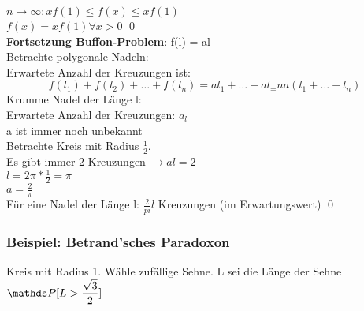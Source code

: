 $n \rightarrow\infty: x f(1) \leq f(x) \leq x f(1)$\smallskip\\
$f(x) = xf(1) \forall x > 0$ \qed\bigskip\\
\textbf{Fortsetzung Buffon-Problem}: f(l) = al\\
Betrachte polygonale Nadeln: \smallskip\\
Erwartete Anzahl der Kreuzungen ist: 
$$f(l_1)+f(l_2)+\dots+f(l_n) = al_1+\dots+al_=n  a(l_1+\dots+l_n)$$
Krumme Nadel der Länge l: \medskip\\
Erwartete Anzahl der Kreuzungen: $a_l$\medskip\\
a ist immer noch unbekannt\medskip\\
Betrachte Kreis mit Radius $\frac{1}{2}$.\\ Es gibt immer 2 Kreuzungen $\rightarrow al = 2$\smallskip\\
$l=2\pi*\frac{1}{2}=\pi$\medskip\\
$a=\frac{2}{\pi}$\medskip\\
Für eine Nadel der Länge l: $\frac{2}{pi}l$ Kreuzungen (im Erwartungswert) \qed
\subsubsection{Beispiel: Betrand'sches Paradoxon}
Kreis mit Radius 1. Wähle zufällige Sehne. L sei die Länge der Sehne \\
$\PP[L>\dfrac{\sqrt{3}}{2}]$\smallskip\\
\smallskip\\


